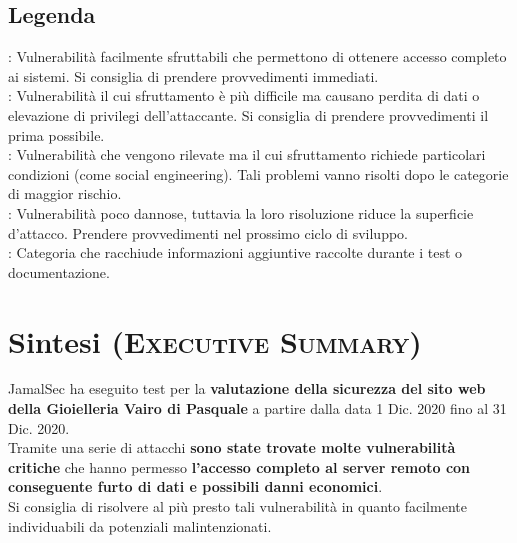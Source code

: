 \begin{cvletter}
\begin{minipage}[t]{0.33\textwidth}
      \footnotesize
      \subsection{Legenda}
      \textsc{}: Vulnerabilità facilmente sfruttabili che permettono di ottenere accesso completo
      ai sistemi. Si consiglia di prendere provvedimenti immediati.\\

      \textsc{}: Vulnerabilità il cui sfruttamento è più difficile ma causano
      perdita di dati o elevazione di privilegi dell'attaccante. Si consiglia di prendere provvedimenti il prima possibile.\\

      \textsc{}: Vulnerabilità che vengono rilevate ma il cui sfruttamento richiede particolari
      condizioni (come social engineering). Tali problemi vanno risolti dopo le categorie di maggior rischio.\\

      \textsc{}: Vulnerabilità poco dannose, tuttavia la loro
      risoluzione riduce la superficie d'attacco. Prendere provvedimenti nel prossimo ciclo di sviluppo.\\

      \textsc{}: Categoria che racchiude informazioni aggiuntive raccolte durante i test
      o documentazione.\\
      \sectionsep


   \end{minipage} 
   \hfill
   \begin{minipage}[t]{0.60\textwidth} 

      \section{\color{awesome-red}Sin\color{darktext}tesi (\textsc{Executive Summary})\ \color{gray}\vhrulefill{0.9pt}}
      \color{text}
      JamalSec ha eseguito test per la \textbf{valutazione della sicurezza del sito web della Gioielleria Vairo di Pasquale} a
      partire dalla data 1 Dic. 2020 fino al 31 Dic. 2020.\\
      Tramite una serie di attacchi \textbf{sono state trovate molte vulnerabilità critiche} che hanno permesso \textbf{l'accesso
      completo al server remoto con conseguente furto di dati e possibili danni economici}.\\
      Si consiglia di risolvere al più presto tali vulnerabilità in quanto facilmente individuabili da potenziali
      malintenzionati.


\end{minipage}
\end{cvletter}
